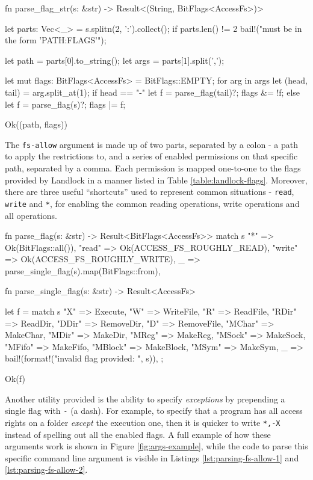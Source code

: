 \begin{code}[language=Rust, caption=Parsing the \texttt{fs-allow} command line option., label=lst:parsing-fs-allow-1]
fn parse_flag_str(s: &str)
    -> Result<(String, BitFlags<AccessFs>)> {
  let parts: Vec<_> = s.splitn(2, ':').collect();
  if parts.len() != 2 {
    bail!("must be in the form 'PATH:FLAGS'");
  }

  let path = parts[0].to_string();
  let args = parts[1].split(',');

  let mut flags: BitFlags<AccessFs> = BitFlags::EMPTY;
  for arg in args {
    let (head, tail) = arg.split_at(1);
    if head == "-" {
      let f = parse_flag(tail)?;
      flags &= !f;
    } else {
      let f = parse_flag(s)?;
      flags |= f;
    }
  }

  Ok((path, flags))
}
\end{code}

The \texttt{fs-allow} argument is made up of two parts, separated by a colon - a path to apply the restrictions to,
and a series of enabled permissions on that specific path, separated by a comma.
Each permission is mapped one-to-one to the flags provided by Landlock in a manner listed in Table \ref{table:landlock-flags}.
Moreover, there are three useful ``shortcuts'' used to represent common situations - \texttt{read}, \texttt{write} and \texttt{*},
for enabling the common reading operations, write operations and all operations.

\begin{code}[language=Rust, caption=Parsing a single Landlock flag., label=lst:parsing-fs-allow-2]
fn parse_flag(s: &str) -> Result<BitFlags<AccessFs>> {
  match s {
    "*" => Ok(BitFlags::all()),
    "read" => Ok(ACCESS_FS_ROUGHLY_READ),
    "write" => Ok(ACCESS_FS_ROUGHLY_WRITE),
    _ => parse_single_flag(s).map(BitFlags::from),
  }
}

fn parse_single_flag(s: &str) -> Result<AccessFs> {
  let f = match s {
    "X" => Execute,
    "W" => WriteFile,
    "R" => ReadFile,
    "RDir" => ReadDir,
    "DDir" => RemoveDir,
    "D" => RemoveFile,
    "MChar" => MakeChar,
    "MDir" => MakeDir,
    "MReg" => MakeReg,
    "MSock" => MakeSock,
    "MFifo" => MakeFifo,
    "MBlock" => MakeBlock,
    "MSym" => MakeSym,
    _ => bail!(format!("invalid flag provided: {}", s)),
  };

  Ok(f)
}
\end{code}

Another utility provided is the ability to specify \textit{exceptions} by prepending a single flag with \texttt{-} (a dash).
For example, to specify that a program has all access rights on a folder \textit{except} the execution one, then it is quicker
to write \texttt{*,-X} instead of spelling out all the enabled flags.
A full example of how these arguments work is shown in Figure \ref{fig:args-example},
while the code to parse this specific command line argument is visible in Listings \ref{lst:parsing-fs-allow-1} and \ref{lst:parsing-fs-allow-2}.

